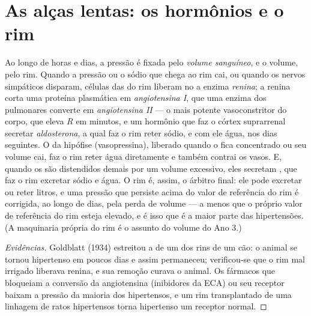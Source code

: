 \section{As alças lentas: os hormônios e o rim}

\begin{proposition}\label{prop:b2:blood-pressure:raas}
Ao longo de horas e dias, a pressão é fixada pelo \emph{volume
sanguíneo}, e o volume, pelo rim. Quando a pressão ou o sódio que chega
ao rim cai, ou quando os nervos simpáticos disparam, células das
 do rim liberam no  a enzima \emph{renina}; a renina
corta uma proteína plasmática em \emph{angiotensina I}, que uma enzima
dos  pulmonares converte em \emph{angiotensina II} --- o mais
potente vasoconstritor do corpo, que eleva $R$ em minutos, e um hormônio
que faz o córtex suprarrenal secretar \emph{aldosterona}, a qual faz o
rim reter sódio, e com ele água, nos dias seguintes. O \emph{} da hipófise (vasopressina), liberado quando o  fica
concentrado ou seu volume cai, faz o rim reter água diretamente e
também contrai os vasos. E, quando os  são distendidos demais por
um volume excessivo, eles secretam \emph{}, que
faz o rim excretar sódio e água. O rim é, assim, o árbitro final: ele
pode excretar ou reter litros, e uma pressão que persiste acima do
valor de referência do rim é corrigida, ao longo de dias, pela perda de
volume --- a menos que o próprio valor de referência do rim esteja
elevado, e é isso que é a maior parte das hipertensões. (A maquinaria
própria do rim é o assunto do volume do Ano 3.)
\end{proposition}
\begin{proof}[Evidências]
Goldblatt (1934) estreitou a  de um dos rins de um cão: o animal
se tornou hipertenso em poucos dias e assim permaneceu; verificou-se que
o rim mal irrigado liberava renina, e sua remoção curava o animal. Os
fármacos que bloqueiam a conversão da angiotensina (inibidores da ECA)
ou seu receptor baixam a pressão da maioria dos hipertensos, e um rim
transplantado de uma linhagem de ratos hipertensos torna hipertenso um
receptor normal.
\end{proof}

